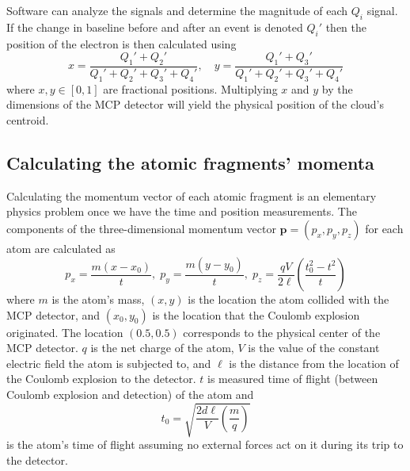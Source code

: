 Software can analyze the signals and determine the magnitude of each $Q_i$ signal. If the change in baseline before and after an event is denoted $Q_i'$ then the position of the electron is then calculated using
\begin{equation}\label{eq:xy}
x = \frac{Q_1' + Q_2'}
{Q_1' + Q_2' + Q_3' + Q_4'} ,\quad
y = \frac{Q_1' + Q_3'}
{Q_1' + Q_2' + Q_3' + Q_4'}
\end{equation}
where $x,y \in [0,1]$ are fractional positions. Multiplying $x$ and $y$ by the dimensions of the MCP detector will yield the physical position of the cloud's centroid.

\subsection{Calculating the atomic fragments' momenta}
Calculating the momentum vector of each atomic fragment is an elementary physics problem once we have the time and position measurements. The components of the three-dimensional momentum vector $\mathbf{p} = (p_x,p_y,p_z)$ for each atom are calculated as
\begin{equation}\label{eq:CEImomenta}
p_x = \frac{m(x-x_0)}{t} ,\;
p_y = \frac{m(y-y_0)}{t} ,\;
p_z = \frac{qV}{2\ell} \left( \frac{t_0^2 - t^2}{t} \right)
\end{equation}
where $m$ is the atom's mass, $(x,y)$ is the location the atom collided with the MCP detector, and $(x_0,y_0)$ is the location that the Coulomb explosion originated. The location $(0.5,0.5)$ corresponds to the physical center of the MCP detector. $q$ is the net charge of the atom, $V$ is the value of the constant electric field the atom is subjected to, and $\ell$ is the distance from the location of the Coulomb explosion to the detector. $t$ is measured time of flight (between Coulomb explosion and detection) of the atom and 
\begin{equation}
t_0 = \sqrt{\frac{2d\ell}{V} \left( \frac{m}{q} \right)}
\end{equation}
is the atom's time of flight assuming no external forces act on it during its trip to the detector.

